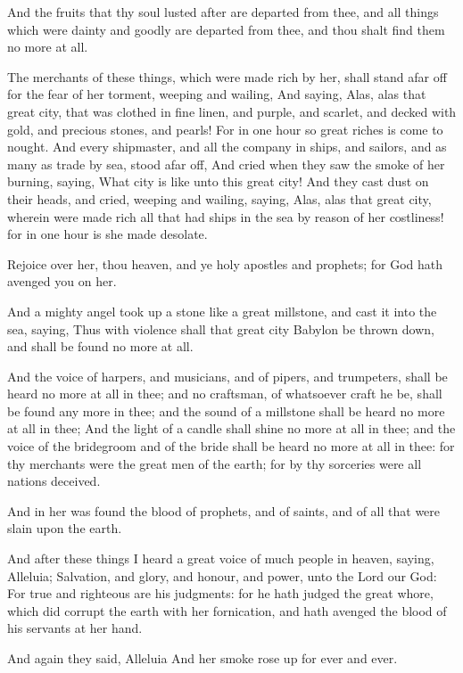 \Verse And the fruits that thy soul lusted after are departed from thee, and all things which were dainty and goodly are departed from thee, and thou shalt find them no more at all.

\Verse The merchants of these things, which were made rich by her, shall stand afar off for the fear of her torment, weeping and wailing, \Verse And saying, Alas, alas that great city, that was clothed in fine linen, and purple, and scarlet, and decked with gold, and precious stones, and pearls!  \Verse For in one hour so great riches is come to nought. And every shipmaster, and all the company in ships, and sailors, and as many as trade by sea, stood afar off, \Verse And cried when they saw the smoke of her burning, saying, What city is like unto this great city!  \Verse And they cast dust on their heads, and cried, weeping and wailing, saying, Alas, alas that great city, wherein were made rich all that had ships in the sea by reason of her costliness!  for in one hour is she made desolate.

\Verse Rejoice over her, thou heaven, and ye holy apostles and prophets; for God hath avenged you on her.

\Verse And a mighty angel took up a stone like a great millstone, and cast it into the sea, saying, Thus with violence shall that great city Babylon be thrown down, and shall be found no more at all.

\Verse And the voice of harpers, and musicians, and of pipers, and trumpeters, shall be heard no more at all in thee; and no craftsman, of whatsoever craft he be, shall be found any more in thee; and the sound of a millstone shall be heard no more at all in thee; \Verse And the light of a candle shall shine no more at all in thee; and the voice of the bridegroom and of the bride shall be heard no more at all in thee: for thy merchants were the great men of the earth; for by thy sorceries were all nations deceived.

\Verse And in her was found the blood of prophets, and of saints, and of all that were slain upon the earth.

\Chapter
\Verse And after these things I heard a great voice of much people in heaven, saying, Alleluia; Salvation, and glory, and honour, and power, unto the Lord our God: \Verse For true and righteous are his judgments: for he hath judged the great whore, which did corrupt the earth with her fornication, and hath avenged the blood of his servants at her hand.

\Verse And again they said, Alleluia And her smoke rose up for ever and ever.

